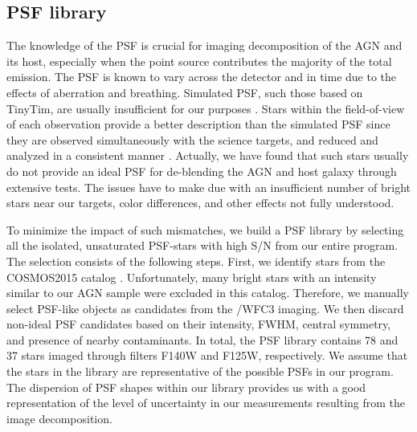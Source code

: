 \documentclass[apj]{emulateapj}
\begin{document}

 
\subsection{PSF library}
\label{sec:psf_library}

The knowledge of the PSF is crucial for imaging decomposition of the AGN and its host, especially when the point source contributes the majority of the total emission. The PSF is known to vary across the detector and in time due to the effects of aberration and breathing. Simulated PSF, such those based on {\sc TinyTim}, are usually insufficient for our purposes \citep{Mechtley2012}. Stars within the field-of-view of each observation provide a better description than the simulated PSF since they are observed simultaneously with the science targets, and reduced and analyzed in a consistent manner \citet{Kim2008, Park15}. Actually, we have found that such stars usually do not provide an ideal PSF for de-blending the AGN and host galaxy through extensive tests. The issues have to make due with an insufficient number of bright stars near our targets, color differences, and other effects not fully understood.

To minimize the impact of such mismatches, we build a PSF library by selecting all the isolated, unsaturated PSF-stars with high S/N from our entire program. The selection consists of the following steps. First, we identify stars from the COSMOS2015 catalog \citep{Laigle2016}. Unfortunately, many bright stars with an intensity similar to our AGN sample were excluded in this catalog. Therefore, we manually select PSF-like objects as candidates from the \hst/WFC3 imaging. We then discard non-ideal PSF candidates based on their intensity, FWHM, central symmetry, and presence of nearby contaminants. In total, the PSF library contains 78 and 37 stars imaged through filters F140W and F125W, respectively. We assume that the stars in the library are representative of the possible PSFs in our program. The dispersion of PSF shapes within our library provides us with a good representation of the level of uncertainty in our measurements resulting from the image decomposition.
\end{document}
